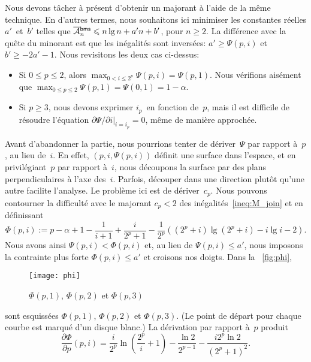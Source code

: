 Nous devons tâcher à présent d'obtenir un majorant à l'aide de la même
technique. En d'autres termes, nous souhaitons ici minimiser les
constantes réelles \(a'\)~et~\(b'\) telles que \(\OM{\fun{bms}}{n}
\leqslant n\lg n + a'n + b'\), pour \(n \geqslant 2\). La différence
avec la quête du minorant est que les inégalités sont inversées:
\(a'\geqslant \Psi(p,i)\) et \(b' \geqslant -2a' - 1\). Nous
revisitons les deux cas ci-dessus:
\begin{itemize}

\item Si \(0 \leqslant p \leqslant 2\), alors \(\max_{0 < i \leqslant
    2^p}\Psi(p,i) = \Psi(p,1)\). Nous vérifions aisément que \(\max_{0
    \leqslant p \leqslant 2}\Psi(p,1) = \Psi(0,1) = 1 - \alpha\).

\item Si \(p \geqslant 3\), nous devons exprimer \(i_p\)~en fonction
  de~\(p\), mais il est difficile de résoudre l'équation
  \(\left.\partial\Psi/\partial i\right|_{i=i_p} = 0\), même de
  manière approchée.

\end{itemize}
Avant d'abandonner la partie, nous pourrions tenter de
dériver~\(\Psi\) par rapport à~\(p\), au lieu de~\(i\). En effet,
\((p,i,\Psi(p,i))\) définit une surface dans l'espace, et en
privilégiant~\(p\) par rapport à~\(i\), nous découpons la surface par
des plans perpendiculaires à l'axe des~\(i\). Parfois, découper dans
une direction plutôt qu'une autre facilite l'analyse. Le problème ici
est de dériver~\(c_p\). Nous pouvons contourner la difficulté avec le
majorant \(c_p < 2\) des inégalités~\eqref{ineq:M_join}
 et en définissant
\begin{equation*}
  \Phi(p,i) := p - \alpha + 1 - \frac{1}{i+1} + \frac{i}{2^p+1} -
  \frac{1}{2^p}((2^p+i)\lg(2^p+i) - i\lg i - 2).
\end{equation*}
Nous avons ainsi \(\Psi(p,i) < \Phi(p,i)\) et, au lieu de \(\Psi(p,i)
\leqslant a'\), nous imposons la contrainte plus forte \(\Phi(p,i)
\leqslant a'\) et croisons nos doigts. Dans la \fig~\vref{fig:phi},
\begin{figure}
\centering
\texttt{[image: phi]}
\caption{\(\Phi(p,1)\), \(\Phi(p,2)\) et \(\Phi(p,3)\)}
\label{fig:phi}
\end{figure}
sont esquissées \(\Phi(p,1)\), \(\Phi(p,2)\) et \(\Phi(p,3)\). (Le
point de départ pour chaque courbe est marqué d'un disque blanc.)
La dérivation par rapport à~\(p\) produit
\begin{equation*}
\frac{\partial\Phi}{\partial p}(p,i) =
\frac{i}{2^p}\ln\left(\frac{2^p}{i}+1\right)
- \frac{\ln 2}{2^{p-1}} - \frac{i2^p\ln 2}{(2^p+1)^2}.
\end{equation*}
